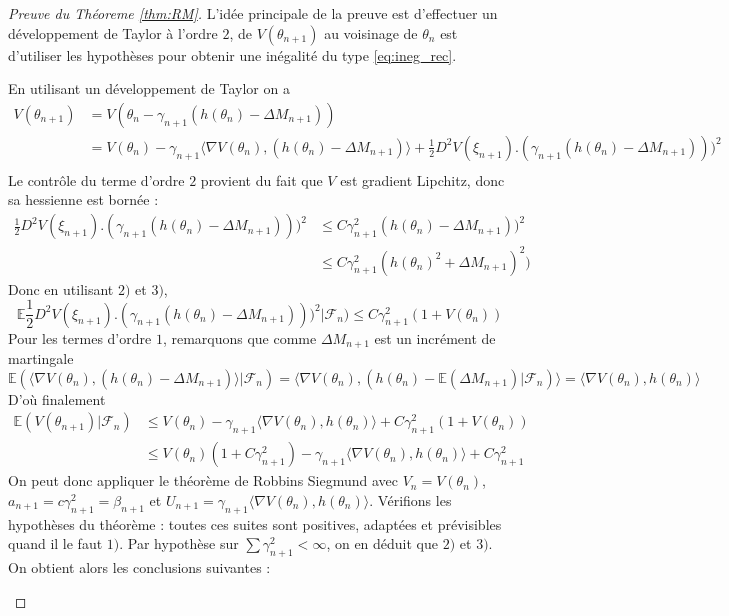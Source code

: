 \documentclass[a4paper,12pt]{book}
\newcommand{\E}{\mathbb{E}}
\newcommand{\Fc}{\mathcal{F}}
\begin{document}
\begin{proof}
[Preuve du Théoreme \ref{thm:RM}]
L'idée principale de la preuve est d'effectuer un développement de Taylor à l'ordre $2$, de $V(\theta_{n+1})$ au voisinage de $\theta_n$ est d'utiliser les hypothèses pour obtenir une inégalité du type \eqref{eq:ineg_rec}.

En utilisant un développement de Taylor on a
\begin{align*}
V(\theta_{n+1})&=V(\theta_n-\gamma_{n+1}(h(\theta_n)-\Delta M_{n+1}))\\
&=V(\theta_n)-\gamma_{n+1}\langle \nabla V(\theta_n), (h(\theta_n)-\Delta M_{n+1})\rangle + \frac{1}{2} D^2 V(\xi_{n+1}).(\gamma_{n+1}(h(\theta_n)-\Delta M_{n+1})))^2\\
\end{align*}
Le contrôle du terme d'ordre $2$ provient du fait que $V$ est gradient Lipchitz, donc sa hessienne est bornée :
\begin{align*}\frac{1}{2} D^2 V(\xi_{n+1}).(\gamma_{n+1}(h(\theta_n)-\Delta M_{n+1})))^2 &\le C\gamma_{n+1}^2 (h(\theta_n)-\Delta M_{n+1}))^2\\
&\le  C\gamma_{n+1}^2(h(\theta_n)^2+\Delta M_{n+1})^2)
\end{align*}
Donc en utilisant $2)$ et $3)$,
$$\E\frac{1}{2} D^2 V(\xi_{n+1}).(\gamma_{n+1}(h(\theta_n)-\Delta M_{n+1})))^2\lvert \Fc_n) \le C\gamma_{n+1}^2 (1+V(\theta_n))$$
Pour les termes d'ordre $1$, remarquons que comme $\Delta M_{n+1}$ est un incrément de martingale
$$\E(\langle \nabla V(\theta_n), (h(\theta_n)-\Delta M_{n+1})\rangle \lvert \Fc_{n})= \langle \nabla V(\theta_n), (h(\theta_n)-\E(\Delta M_{n+1})\lvert \Fc_{n})\rangle =\langle \nabla V(\theta_n), h(\theta_n)\rangle$$
D'où finalement
\begin{align}
\E(V(\theta_{n+1})\lvert \Fc_n)&\le  V(\theta_n) - \gamma_{n+1} \langle \nabla V(\theta_n), h(\theta_n)\rangle +C\gamma_{n+1}^2 (1+V(\theta_n))\nonumber\\
&\le  V(\theta_n)(1+C\gamma_{n+1}^2) - \gamma_{n+1} \langle \nabla V(\theta_n), h(\theta_n)\rangle +C\gamma_{n+1}^2
\label{eq:rec_Vn}
\end{align}
On peut donc appliquer le théorème de Robbins Siegmund avec $V_n=V(\theta_n)$, $a_{n+1}=c\gamma_{n+1}^2=\beta_{n+1}$ et  $U_{n+1}=\gamma_{n+1}\langle \nabla V(\theta_n), h(\theta_n)\rangle$.
Vérifions les hypothèses du théorème : toutes ces suites sont positives, adaptées et prévisibles quand il le faut $1)$. Par hypothèse sur $\sum \gamma_{n+1}^2<\infty$, on en déduit que $2)$ et $3)$.
On obtient alors les conclusions suivantes :\begin{itemize}

\end{itemize}
\end{proof}
\end{document}
